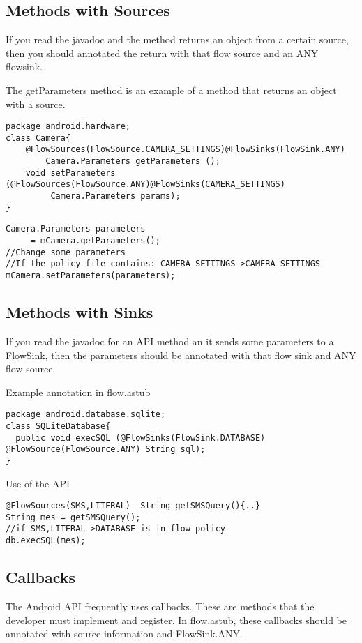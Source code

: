 \subsection{Methods with Sources}
If you read the javadoc and the method returns an object from a certain source, then you should annotated 
the return with that flow source and an ANY flowsink.

The getParameters method is an example of a method that returns an object with a source.
\begin{Verbatim}
package android.hardware;
class Camera{
    @FlowSources(FlowSource.CAMERA_SETTINGS)@FlowSinks(FlowSink.ANY)
        Camera.Parameters getParameters ();
    void setParameters (@FlowSources(FlowSource.ANY)@FlowSinks(CAMERA_SETTINGS) 
         Camera.Parameters params);
}
\end{Verbatim}

\begin{Verbatim}
Camera.Parameters parameters
     = mCamera.getParameters();
//Change some parameters
//If the policy file contains: CAMERA_SETTINGS->CAMERA_SETTINGS
mCamera.setParameters(parameters);
\end{Verbatim}



\subsection{Methods with Sinks}
If you read the javadoc for an API method an it sends some parameters to a FlowSink, then the parameters
should be annotated with that flow sink and ANY flow source.  

Example annotation in flow.astub
\begin{Verbatim}
package android.database.sqlite;
class SQLiteDatabase{
  public void execSQL (@FlowSinks(FlowSink.DATABASE) @FlowSource(FlowSource.ANY) String sql);
}
\end{Verbatim}
Use of the API
\begin{Verbatim}
@FlowSources(SMS,LITERAL)  String getSMSQuery(){..}
String mes = getSMSQuery();
//if SMS,LITERAL->DATABASE is in flow policy
db.execSQL(mes);
\end{Verbatim}

\subsection{Callbacks}
The Android API frequently uses callbacks.  These are methods that the developer must 
implement and register. In flow.astub, these callbacks should be annotated
with source information and FlowSink.ANY.  

